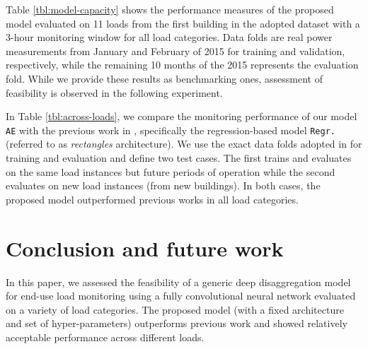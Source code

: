 \documentclass[twocolumn,letter,10pt]{IEEEtran} %
\begin{document}
Table \ref{tbl:model-capacity} shows the performance measures of the  proposed model evaluated on 11 loads from the first building in the adopted dataset with a 3-hour monitoring window for all load categories. Data folds are real power measurements from January and February of 2015 for training and validation, respectively, while the remaining 10 months of the 2015 represents the evaluation fold. While we provide these results as benchmarking ones, assessment of feasibility is observed in the following experiment.

In Table \ref{tbl:across-loads}, we compare the monitoring performance of our model \texttt{AE} with the previous work in \cite{Kelly_2015}, specifically the regression-based model \texttt{Regr.} (referred to as \emph{rectangles} architecture). We use the exact data folds adopted in \cite{Kelly_2015} for training and evaluation and define two test cases. The first trains and evaluates on the same load instances but future periods of operation while the second evaluates on new load instances (from new buildings). In both cases, the proposed model outperformed previous works in all load categories.


\section{Conclusion and future work}
\label{sec:conclusion}

In this paper, we assessed the feasibility of a generic deep disaggregation model for end-use load monitoring using a fully convolutional neural network evaluated on a variety of load categories.
The proposed model (with a fixed architecture and set of hyper-parameters) outperforms previous work and showed relatively acceptable performance across different loads.



{\small\vspace{-1mm}

}
\end{document}
